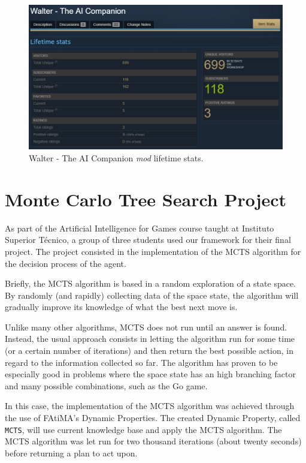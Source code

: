 \begin{figure}
  \centering
  \includegraphics[width=\textwidth]{./Images/walter-stats}
  \caption{Walter - The AI Companion \textit{mod} lifetime stats.}
  \label{fig:walter-stats}
\end{figure}

\section{Monte Carlo Tree Search Project}

\noindent As part of the Artificial Intelligence for Games course taught at Instituto Superior Técnico, a group of three students used our framework for their final project.
The project consisted in the implementation of the \ac{MCTS} algorithm for the decision process of the agent.

Briefly, the \ac{MCTS} algorithm is based in a random exploration of a state space.
By randomly (and rapidly) collecting data of the space state, the algorithm will gradually improve its knowledge of what the best next move is.

Unlike many other algorithms, \ac{MCTS} does not run until an answer is found.
Instead, the usual approach consists in letting the algorithm run for some time (or a certain number of iterations) and then return the best possible action, in regard to the information collected so far.
The algorithm has proven to be especially good in problems where the space state has an high branching factor and many possible combinations, such as the Go game.

In this case, the implementation of the \ac{MCTS} algorithm was achieved through the use of \ac{FAtiMA}'s Dynamic Properties.
The created Dynamic Property, called \texttt{MCTS}, will use current knowledge base and apply the \ac{MCTS} algorithm.
The \ac{MCTS} algorithm was let run for two thousand iterations (about twenty seconds) before returning a plan to act upon.

